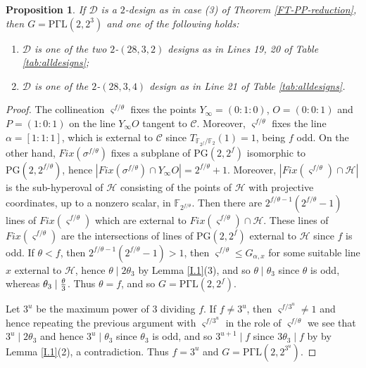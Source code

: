 \documentclass[a4paper,twopage,reqno,12pt]{amsart}
\newtheorem{proposition}[theorem]{Proposition}
\theoremstyle{definition}
\numberwithin{equation}{section}
\newcommand{\PGaL}{\mathrm{P\Gamma L}}
\newcommand{\PG}{\mathrm{PG}}
\renewcommand{\leq}{\leqslant}
\begin{document}
\begin{proposition}\label{Ifin}    
If $\mathcal{D}$ is a $2$-design as in case (3) of Theorem \ref{FT-PP-reduction}, then  $G=\PGaL(2,2^{3})$ and one of the following holds:

\begin{enumerate}
\item $\mathcal{D}$ is one of the two $2$-$(28,3,2)$ designs as in Lines 19, 20 of Table \ref{tab:alldesigns};
\item  $\mathcal{D}$ is one of the $2$-$(28,3,4)$ design as in Line 21 of Table \ref{tab:alldesigns}.
\end{enumerate}
\end{proposition}

\begin{proof}
The collineation $\varsigma^{f/\theta }$ fixes the points $Y_{\infty}=(0:1:0)$, $O=(0:0:1)$ and $P=(1:0:1)$ on the line $Y_{\infty}O$ tangent to $\mathcal{C}$. Moreover, $\varsigma^{f/\theta }$ fixes the line $\alpha=[1:1:1]$, which is external to $\mathcal{C}$ since $T_{\mathbb{F}_{2^{f}}/\mathbb{F}_{2}}(1)=1$, being $f$ odd. On the other hand, $Fix(\sigma ^{f/\theta })$ fixes a subplane of $\PG(2,2^f)$ isomorphic to $\PG(2,2^{f/\theta})$, hence $\left \vert Fix(\sigma ^{f/\theta })\cap Y_{\infty}O \right\vert=2^{f/\theta}+1$. Moreover, $\left \vert Fix(\varsigma ^{f/\theta })\cap \mathcal{H} \right\vert$ is the sub-hyperoval of $\mathcal{H}$ consisting of the points of $\mathcal{H}$ with projective coordinates, up to a nonzero scalar, in $\mathbb{F}_{2^{f/\theta}}$. Then there are $2^{f/\theta-1}(2^{f/\theta}-1)$ lines of $Fix(\varsigma ^{f/\theta })$ which are external to $Fix(\varsigma ^{f/\theta })\cap \mathcal{H}$. These lines of $Fix(\varsigma ^{f/\theta })$ are the intersections of lines of $\PG(2,2^{f})$ external to $\mathcal{H}$ since $f$ is odd. 
If $\theta <f$, then $2^{f/\theta-1}(2^{f/\theta}-1)>1$, then $\varsigma ^{f/\theta
}\leq G_{\alpha ,x}$ for some suitable line $x$ external to $\mathcal{H}$, hence $\theta \mid 2\theta _{3}$ by Lemma \ref{I.1}(3), and so $\theta
\mid \theta _{3}$ since $\theta $ is odd, whereas $\theta _{3}\mid \frac{\theta }{%
3}$. Thus $\theta =f$, and so $G=\PGaL(2,2^{f})$.

Let $3^{u}$ be the maximum power of $3$ dividing $f$. If $f\neq 3^{u}$, then 
$\varsigma ^{f/3^{u}}\neq 1$ and hence repeating the previous argument with $%
\varsigma ^{f/3^{u}}$ in the role of $\varsigma ^{f/\theta }$ we see that $%
3^{u}\mid 2\theta _{3}$ and hence $3^{u}\mid \theta _{3}$ since $\theta _{3}$
is odd, and so $3^{u+1}\mid f $ since $3\theta _{3}\mid f $ by by Lemma \ref{I.1}(2), a
contradiction. Thus $f=3^{u}$ and $G=\PGaL(2,2^{3^{u}})$.


\end{proof}
\end{document}
